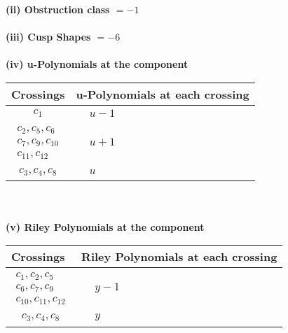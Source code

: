\documentclass[1p]{elsarticle_modified}
\theoremstyle{definition}
\begin{document}
\flushleft \textbf{(ii) Obstruction class $= -1$}\\~\\
\flushleft \textbf{(iii) Cusp Shapes $= -6$}\\~\\
\newpage\renewcommand{\arraystretch}{1}
\flushleft \textbf{(iv) u-Polynomials at the component}\newline \\
\begin{tabular}{m{50pt}|m{274pt}}
Crossings & \hspace{64pt}u-Polynomials at each crossing \\
\hline $$\begin{aligned}c_{1}\end{aligned}$$&$\begin{aligned}
&u-1
\end{aligned}$\\
\hline $$\begin{aligned}c_{2},c_{5},c_{6}\\c_{7},c_{9},c_{10}\\c_{11},c_{12}\end{aligned}$$&$\begin{aligned}
&u+1
\end{aligned}$\\
\hline $$\begin{aligned}c_{3},c_{4},c_{8}\end{aligned}$$&$\begin{aligned}
&u
\end{aligned}$\\
\hline
\end{tabular}\\~\\
\newpage\renewcommand{\arraystretch}{1}
\flushleft \textbf{(v) Riley Polynomials at the component}\newline \\
\begin{tabular}{m{50pt}|m{274pt}}
Crossings & \hspace{64pt}Riley Polynomials at each crossing \\
\hline $$\begin{aligned}c_{1},c_{2},c_{5}\\c_{6},c_{7},c_{9}\\c_{10},c_{11},c_{12}\end{aligned}$$&$\begin{aligned}
&y-1
\end{aligned}$\\
\hline $$\begin{aligned}c_{3},c_{4},c_{8}\end{aligned}$$&$\begin{aligned}
&y
\end{aligned}$\\
\hline
\end{tabular}\\~\\
\end{document}
